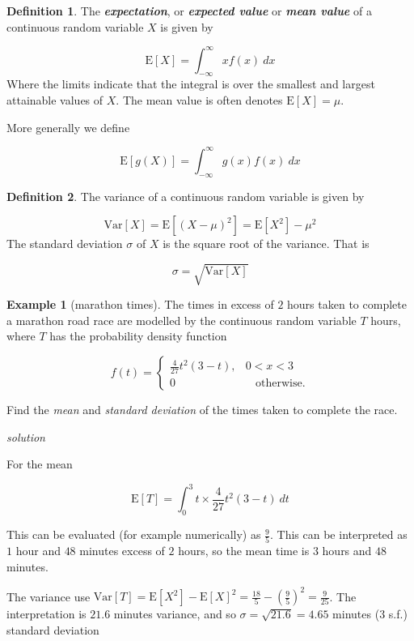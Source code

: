 \documentclass[
]{book}
\theoremstyle{definition}
\newtheorem{definition}{Definition}[chapter]
\theoremstyle{definition}
\newtheorem{example}{Example}[chapter]
\theoremstyle{definition}
\theoremstyle{definition}
\theoremstyle{remark}
\begin{document}
\begin{definition}
The \textbf{\emph{expectation}}, or \textbf{\emph{expected value}} or \textbf{\emph{mean value}} of a continuous random variable \(X\) is given by

\[ \text{E}[X] = \int_{-\infty}^{\infty}x f(x) \ dx\]
Where the limits indicate that the integral is over the smallest and largest attainable values of \(X\). The mean value is often denotes \(\text{E}[X] = \mu\).

More generally we define

\[ \text{E}[g(X)] = \int_{-\infty}^{\infty}g(x) f(x) \ dx\]
\end{definition}

\begin{definition}
The variance of a continuous random variable is given by

\[\text{Var}[X] = \text{E}[(X-\mu)^2] = \text{E}[X^2]-\mu^2\]
The standard deviation \(\sigma\) of \(X\) is the square root of the variance. That is

\[\sigma = \sqrt{\text{Var}[X]}\]
\end{definition}

\begin{example}[marathon times]
The times in excess of \(2\) hours taken to complete a marathon road race are modelled by the continuous random variable \(T\) hours, where \(T\) has the probability density function

\begin{equation*}
  f(t)=\begin{cases}
    \frac{4}{27}t^2(3-t), &  0< x < 3\\
    0 & \ \ \ \  \text{otherwise}.
  \end{cases}
\end{equation*}

Find the \emph{mean} and \emph{standard deviation} of the times taken to complete the race.
\end{example}

\emph{solution}

For the mean

\[ \text{E}[T] = \int_{0}^{3} t\times \frac{4}{27}t^2(3-t) \ dt\]

This can be evaluated (for example numerically) as \(\frac{9}{5}\). This can be interpreted as \(1\) hour and \(48\) minutes excess of \(2\) hours, so the mean time is \(3\) hours and \(48\) minutes.

The variance use \(\text{Var}[T]=\text{E}[X^2]-\text{E}[X]^2 = \frac{18}{5} - (\frac{9}{5})^2 =\frac{9}{25}\). The interpretation is \(21.6\) minutes variance, and so \(\sigma = \sqrt{21.6} = 4.65\) minutes (\(3\) s.f.) standard deviation
\end{document}
